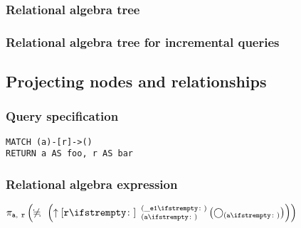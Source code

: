\subsubsection*{Relational algebra tree}


\subsubsection*{Relational algebra tree for incremental queries}


\subsection{Projecting nodes and relationships}

\subsubsection*{Query specification}

\begin{lstlisting}
MATCH (a)-[r]->()
RETURN a AS foo, r AS bar
\end{lstlisting}

\subsubsection*{Relational algebra expression}

$\projection{\var{a},~\var{r}} \left(\alldifferent{} \left(\expandout{r}{}{a}{\_e1}{} \left(\getvertices{a}{}\right)\right)\right)$

